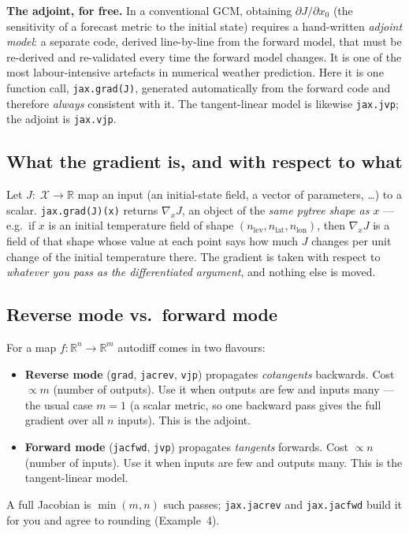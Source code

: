 \documentclass[11pt]{article}
\newcommand{\R}{\mathbb{R}}
\newcommand{\code}[1]{\texttt{#1}}
\begin{document}
\begin{keybox}
\textbf{The adjoint, for free.} In a conventional GCM, obtaining
$\partial J/\partial x_0$ (the sensitivity of a forecast metric to the initial
state) requires a hand-written \emph{adjoint model}: a separate code, derived
line-by-line from the forward model, that must be re-derived and re-validated every
time the forward model changes. It is one of the most labour-intensive artefacts in
numerical weather prediction. Here it is one function call, \code{jax.grad(J)},
generated automatically from the forward code and therefore \emph{always}
consistent with it. The tangent-linear model is likewise \code{jax.jvp}; the
adjoint is \code{jax.vjp}.
\end{keybox}

\subsection{What the gradient is, and with respect to what}

Let $J:\;\mathcal X\to\R$ map an input (an initial-state field, a vector of
parameters, \dots) to a scalar. \code{jax.grad(J)(x)} returns
$\nabla_x J$, an object of the \emph{same pytree shape as $x$} --- e.g.\ if $x$ is
an initial temperature field of shape $(n_{\text{lev}},n_{\text{lat}},n_{\text{lon}})$,
then $\nabla_x J$ is a field of that shape whose value at each point says how much
$J$ changes per unit change of the initial temperature there. The gradient is
taken with respect to \emph{whatever you pass as the differentiated argument}, and
nothing else is moved.

\subsection{Reverse mode vs.\ forward mode}

For a map $f:\R^n\to\R^m$ autodiff comes in two flavours:
\begin{itemize}
\item \textbf{Reverse mode} (\code{grad}, \code{jacrev}, \code{vjp}) propagates
  \emph{cotangents} backwards. Cost $\propto m$ (number of outputs). Use it when
  outputs are few and inputs many --- the usual case $m=1$ (a scalar metric, so one
  backward pass gives the full gradient over all $n$ inputs). This is the adjoint.
\item \textbf{Forward mode} (\code{jacfwd}, \code{jvp}) propagates \emph{tangents}
  forwards. Cost $\propto n$ (number of inputs). Use it when inputs are few and
  outputs many. This is the tangent-linear model.
\end{itemize}
A full Jacobian is $\min(m,n)$ such passes; \code{jax.jacrev} and \code{jax.jacfwd}
build it for you and agree to rounding (Example~4).
\end{document}
